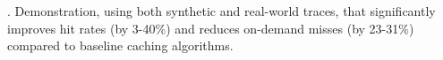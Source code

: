     . Demonstration, using both synthetic and real-world traces, that \spaarc{} significantly improves hit rates (by 3-40\%) and reduces on-demand misses (by 23-31\%) compared to baseline caching algorithms.
\fi

